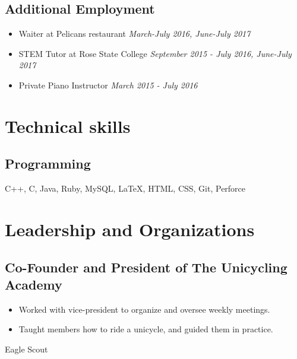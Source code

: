 \documentclass{article}
\begin{document}
\subsection{Additional Employment}
\begin{itemize}
	\item Waiter at Pelicans restaurant \hfill\textit{March-July 2016, June-July 2017} 
	
	\item STEM Tutor at Rose State College \hfill\textit{September 2015 - July 2016, June-July 2017} 
	
	\item Private Piano Instructor \hfill\textit{March 2015 - July 2016}
\end{itemize}

\section{Technical skills}

\subsection{Programming}

C++, C, Java, Ruby, MySQL, {\LaTeX}, HTML, CSS, Git, Perforce

\section{Leadership and Organizations}
\subsection{Co-Founder and President of The Unicycling Academy}
\begin{itemize}
	\item Worked with vice-president to organize and oversee weekly meetings. 
	\item Taught members how to ride a unicycle, and guided them in practice.
\end{itemize}
\noindent
Eagle Scout
\end{document}
